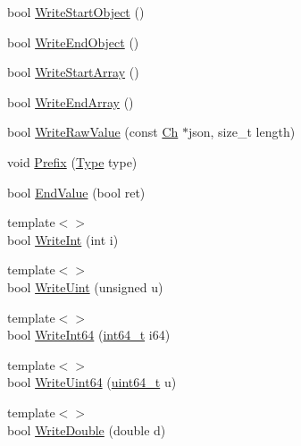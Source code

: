 \begin{DoxyCompactItemize}
\item 
bool \mbox{\hyperlink{classrapidjson_1_1_writer_aed07aaa7245d5e607933a75c634921f9}{Write\+Start\+Object}} ()
\item 
bool \mbox{\hyperlink{classrapidjson_1_1_writer_afc5bc83bdf5fda810c8fe200cdda12b5}{Write\+End\+Object}} ()
\item 
bool \mbox{\hyperlink{classrapidjson_1_1_writer_a1221be4404ddaddc9605725e69dc7e53}{Write\+Start\+Array}} ()
\item 
bool \mbox{\hyperlink{classrapidjson_1_1_writer_a60939802ba2dfdd19754f20bda553a26}{Write\+End\+Array}} ()
\item 
bool \mbox{\hyperlink{classrapidjson_1_1_writer_a60b50a90fa1cfd525e14c37c36b9998d}{Write\+Raw\+Value}} (const \mbox{\hyperlink{classrapidjson_1_1_writer_a2cf973937ca1110293bf1350fac2a6d6}{Ch}} $\ast$json, size\+\_\+t length)
\item 
void \mbox{\hyperlink{classrapidjson_1_1_writer_aefe33eab3521b2d9366dff3b788f0665}{Prefix}} (\mbox{\hyperlink{namespacerapidjson_ae79a4751c1c460ff0de5ecc07874f3e4}{Type}} type)
\item 
bool \mbox{\hyperlink{classrapidjson_1_1_writer_adca78a0b05864d1c903f9afa955f3b07}{End\+Value}} (bool ret)
\item 
{\footnotesize template$<$$>$ }\\bool \mbox{\hyperlink{classrapidjson_1_1_writer_ab2ccb801bfd355ecc03a3a3ba5eb7392}{Write\+Int}} (int i)
\item 
{\footnotesize template$<$$>$ }\\bool \mbox{\hyperlink{classrapidjson_1_1_writer_ab7c08a743fff55d9f09dc58f0a75e67f}{Write\+Uint}} (unsigned u)
\item 
{\footnotesize template$<$$>$ }\\bool \mbox{\hyperlink{classrapidjson_1_1_writer_a91d238a4532d08363f97f37d3626632b}{Write\+Int64}} (\mbox{\hyperlink{stdint_8h_a414156feea104f8f75b4ed9e3121b2f6}{int64\+\_\+t}} i64)
\item 
{\footnotesize template$<$$>$ }\\bool \mbox{\hyperlink{classrapidjson_1_1_writer_a474abb8f7b704f1ef7c00bbe2a2e01b6}{Write\+Uint64}} (\mbox{\hyperlink{stdint_8h_aec6fcb673ff035718c238c8c9d544c47}{uint64\+\_\+t}} u)
\item 
{\footnotesize template$<$$>$ }\\bool \mbox{\hyperlink{classrapidjson_1_1_writer_a7d18f380070f825f48a494c8213adf9c}{Write\+Double}} (double d)
\end{DoxyCompactItemize}
